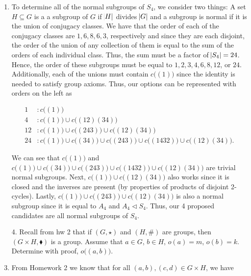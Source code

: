 \documentclass[12pt]{article}
\makeatletter
\theoremstyle{definition}
\theoremstyle{remark}
\renewenvironment{proof}[1][\proofname]{\par
  \pushQED{\qed}%
  \normalfont \topsep6\p@\@plus6\p@\relax
  \list{}{\leftmargin=0mm
          \rightmargin=0mm
          \settowidth{\itemindent}{\itshape#1}%
          \labelwidth=\itemindent
          \parsep=0pt \listparindent=\parindent 
  }
  \item[\hskip\labelsep
        \itshape
    #1\@addpunct{.}]\ignorespaces
}{%
  \popQED\endlist\@endpefalse
}
\newenvironment{solution}[1][\bf{\textit{Solution}}]{\par
  
  \normalfont \topsep6\p@\@plus6\p@\relax
  \list{}{\leftmargin=0mm
          \rightmargin=0mm
          \settowidth{\itemindent}{\itshape#1}%
          \labelwidth=\itemindent
          \parsep=0pt \listparindent=\parindent 
  }
  \item[\hskip\labelsep
        \itshape
    #1\@addpunct{.}]\ignorespaces
}{%
  \popQED\endlist\@endpefalse
}
\let\oldproofname=\proofname
\renewcommand{\proofname}{\bf{\textit{\oldproofname}}}
\makeatother
\begin{document}
\begin{enumerate}[leftmargin=*]
\begin{solution}
                To determine all of the normal subgroups of $S_4$, we consider two things: A set $H\subseteq G$ is a a subgroup of $G$ if $\abs{H}$ divides $\abs{G}$ and a subgroup is normal if it is the union of conjugacy classes. We have that the order of each of the conjugacy classes are $1,6,8,6,3$, respectively and since they are each disjoint, the order of the union of any collection of them is equal to the sum of the orders of each individual class. Thus, the sum must be a factor of $\abs{S_4}=24$. Hence, the order of these subgroups must be equal to $1,2,3,4,6,8,12$, or $24$. Additionally, each of the unions must contain $c\big((1)\big)$ since the identity is needed to satisfy group axioms. Thus, our options can be represented with orders on the left as 
                
                \begin{equation*}
                    \begin{split}
                        1&: c\big((1)\big) \\
                        4&: c\big((1)\big)\cup c\big((12)(34)\big) \\
                        12&: c\big((1)\big)\cup c\big((243)\big)\cup c\big((12)(34)\big) \\
                        24&: c\big((1)\big)\cup c\big((34)\big)\cup c\big((243)\big)\cup c\big((1432)\big)\cup c\big((12)(34)\big).
                    \end{split}
                \end{equation*}
                
                We can see that $c\big((1)\big)$ and $c\big((1)\big)\cup c\big((34)\big)\cup c\big((243)\big)\cup c\big((1432)\big)\cup c\big((12)(34)\big)$ are trivial normal subgroups. Next, $c\big((1)\big)\cup c\big((12)(34)\big)$ also works since it is closed and the inverses are present (by properties of products of disjoint 2-cycles). Lastly, $c\big((1)\big)\cup c\big((243)\big)\cup c\big((12)(34)\big)$ is also a normal subgroup since it is equal to $A_4$ and $A_4\triangleleft S_4$. Thus, our 4 proposed candidates are all normal subgroups of $S_4$.
            \end{solution}
            
        \item[4.] Recall from hw 2 that if $(G,\star)$ and $(H,\#)$ are groups, then $(G\times H, \blacklozenge)$ is a group.  Assume that $a\in G$, $b\in H$, $o(a)=m$, $o(b)=k$. Determine with proof, $o\big((a,b)\big)$.
            \begin{proof}
                From Homework 2 we know that for all $(a,b),(c,d)\in G\times H$, we have 
                

\end{proof}
\end{enumerate}
\end{document}
